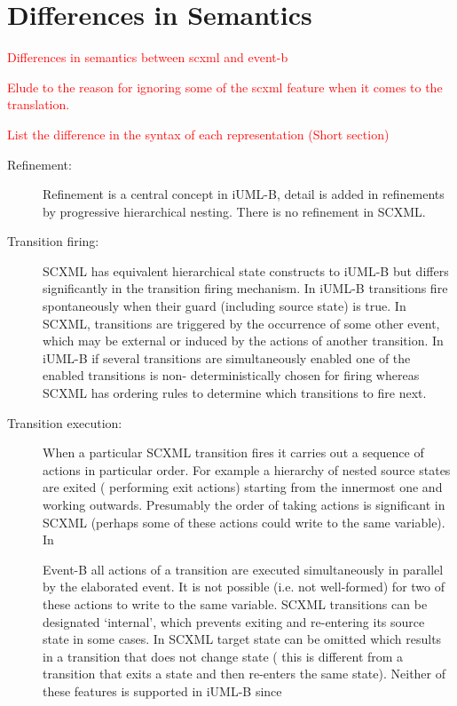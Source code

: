 \documentclass{easychair}
\begin{document}

\section{Differences in Semantics}
\label{sect:diff}

\textcolor{red}{Differences in semantics between scxml and event-b}

\textcolor{red}{Elude to the reason for ignoring some of the scxml feature 
when it comes to the translation.}

\textcolor{red}{List the difference in the syntax of each representation (Short section)}

\begin{description}
\item [Refinement:]
Refinement is a central concept in iUML-B, detail is 
added in refinements by progressive hierarchical 
nesting. There is no refinement in SCXML.

\item [Transition firing:]
SCXML has equivalent hierarchical state constructs to 
iUML-B but differs significantly in the transition 
firing mechanism. In iUML-B transitions fire 
spontaneously when their guard (including source state) 
is true. In SCXML, transitions are triggered by the 
occurrence of some other event, which may be external 
or induced by the actions of another transition. 
In iUML-B if several transitions are simultaneously 
enabled one of the enabled transitions is non-
deterministically chosen for firing whereas SCXML has 
ordering rules to determine which transitions to fire 
next.

\item [Transition execution:]
When a particular SCXML transition fires it carries out 
a sequence of actions in particular order. For example 
a hierarchy of nested source states are exited (
performing exit actions) starting from the innermost 
one and working outwards. Presumably the order of 
taking actions is significant in SCXML (perhaps some of 
these actions could write to the same variable). In 

Event-B all actions of a transition are executed 
simultaneously in parallel by the elaborated event. It 
is not possible (i.e. not well-formed) for two of these 
actions to write to the same variable.
SCXML transitions can be designated ‘internal’, which 
prevents exiting and re-entering its source state in 
some cases. In SCXML target state can be omitted which 
results in a transition that does not change state (
this is different from a transition that exits a state 
and then re-enters the same state).
Neither of these features is supported in iUML-B since 


\end{description}
\end{document}
